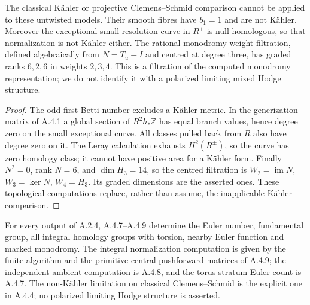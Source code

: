 \begin{proposition}\label{push:src:A.4.4}\label{push:A44}
The classical K\"ahler or projective Clemens--Schmid
comparison cannot be applied to these untwisted models.
Their smooth fibres have $b_1=1$ and are not K\"ahler.
Moreover the exceptional small-resolution curve in
$R^\pm$ is null-homologous, so that normalization is
not K\"ahler either. The rational monodromy weight
filtration, defined algebraically from $N=T_u-I$ and
centred at degree three, has graded ranks $6,2,6$ in
weights $2,3,4$. This is a filtration of the computed
monodromy representation; we do not identify it with
a polarized limiting mixed Hodge structure.
\end{proposition}
\begin{proof}
The odd first Betti number excludes a K\"ahler metric.
In the generization matrix of A.4.1 a global section of
$R^2h_*\mathbb Z$ has equal branch values, hence degree
zero on the small exceptional curve. All classes pulled
back from $R$ also have degree zero on it. The Leray
calculation exhausts $H^2(R^\pm)$, so the curve has
zero homology class; it cannot have positive area for
a K\"ahler form. Finally $N^2=0$, rank $N=6$, and
$\dim H_3=14$, so the centred filtration is
$W_2=\operatorname{im}N$, $W_3=\ker N$, $W_4=H_3$.
Its graded dimensions are the asserted ones. These
topological computations replace, rather than assume,
the inapplicable K\"ahler comparison.
\end{proof}

\begin{corollary}\label{push:src:A.4.5}\label{push:A45}
For every output of A.2.4, A.4.7--A.4.9 determine the
Euler number, fundamental group, all integral homology
groups with torsion, nearby Euler function and marked
monodromy. The integral normalization computation is
given by the finite algorithm and the primitive
central pushforward matrices of A.4.9; the independent
ambient computation is A.4.8, and the torus-stratum
Euler count is A.4.7. The non-K\"ahler limitation on
classical Clemens--Schmid is the explicit one in
A.4.4; no polarized limiting Hodge structure is
asserted.
\end{corollary}

